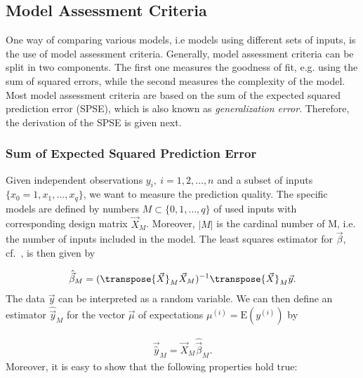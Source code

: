 \subsection{Model Assessment Criteria} \label{subsec:MAC}

One way of comparing various models, i.e models using different sets of inputs, is the use of model assessment criteria. Generally, model assessment criteria can be split in two components. The first one measures the goodness of fit, e.g. using the sum of squared errors, while the second measures the complexity of the model. Most model assessment criteria are based on the sum of the expected squared prediction error (SPSE), which is also known as \emph{generalization error}. Therefore, the derivation of the SPSE is given next. 

\subsubsection{Sum of Expected Squared Prediction Error} \label{subsubsec:SPSE}

Given independent observations $y_i, \ i=1,2, \dots, n$ and a subset of inputs $\{x_0=1, x_1, \dots, x_q\}$, we want to measure the prediction quality. The specific models are defined by numbers $M \subset \{0, 1, \dots, q\}$ of used inputs with corresponding design matrix $\vec{X}_M$. Moreover, $\vert M \vert$ is the cardinal number of M, i.e. the number of inputs included in the model. The least squares estimator for $\vec{\beta}$, cf.~, is then given by

\begin{align*}
	\hat{\vec{\beta}}_{M} = (\transpose{\vec{X}}_M \vec{X}_M)^{-1} \transpose{\vec{X}}_M \vec{y}.
\end{align*}
%
The data $\vec{y}$ can be interpreted as a random variable. We can then define an estimator $\hat{\vec{y}}_M$ for the vector $\vec{\mu}$ of expectations $\mu^{(i)} = \text{E}(y^{(i)})$ by

\begin{align} \label{eq:SPSE-estimator-y}
	\vec{\hat{y}}_M = \vec{X}_M  \hat{\vec{\beta}}_M.
\end{align}
%
Moreover, it is easy to show that the following properties hold true:

